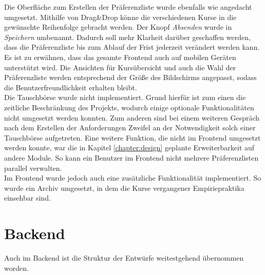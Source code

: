         Die Oberfläche zum Erstellen der Präferenzliste wurde ebenfalls wie angedacht umgesetzt.
        Mithilfe von Drag\&Drop könne die verschiedenen Kurse in die gewünschte Reihenfolge gebracht werden.
        Der Knopf \textit{Absenden} wurde in \textit{Speichern} umbenannt.
        Dadurch soll mehr Klarheit darüber geschaffen werden, dass die Präferenzliste bis zum Ablauf der Frist jederzeit verändert werden kann.\\
        
        Es ist zu erwähnen, dass das gesamte Frontend auch auf mobilen Geräten unterstützt wird.
        Die Ansichten für Kursübersicht und auch die Wahl der Präferenzliste werden entsprechend der Größe des Bildschirms angepasst, sodass die Benutzerfreundlichkeit erhalten bleibt.\\
        
        Die Tauschbörse wurde nicht implementiert.
        Grund hierfür ist zum einen die zeitliche Beschränkung des Projekts, wodurch einige optionale Funktionalitäten nicht umgesetzt werden konnten.
        Zum anderen sind bei einem weiteren Gespräch nach dem Erstellen der Anforderungen Zweifel an der Notwendigkeit solch einer Tauschbörse aufgetreten.
        Eine weitere Funktion, die nicht im Frontend umgesetzt werden konnte, war die in Kapitel \ref{chapter:design} geplante Erweiterbarkeit auf andere Module.
        So kann ein Benutzer im Frontend nicht mehrere Präferenzlisten parallel verwalten.\\
        
        Im Frontend wurde jedoch auch eine zusätzliche Funktionalität implementiert.
        So wurde ein Archiv umgesetzt, in dem die Kurse vergangener Empiriepraktika einsehbar sind.
    
    \section{Backend}
        Auch im Backend ist die Struktur der Entwürfe weitestgehend übernommen worden.
        

